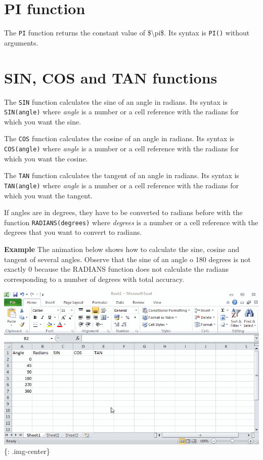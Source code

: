 \section{PI function}
\label{pifunction}

The \texttt{PI} function returns the constant value of \$\textbackslash{}pi\$. Its syntax is \texttt{PI()} without arguments. 

\section{SIN, COS and TAN functions}
\label{sincosandtanfunctions}

The \texttt{SIN} function calculates the sine of an angle in radians. Its syntax is \texttt{SIN(angle)} where \emph{angle} is a number or a cell reference with the radians for which you want the sine. 

The \texttt{COS} function calculates the cosine of an angle in radians. Its syntax is \texttt{COS(angle)} where \emph{angle} is a number or a cell reference with the radians for which you want the cosine. 

The \texttt{TAN} function calculates the tangent of an angle in radians. Its syntax is \texttt{TAN(angle)} where \emph{angle} is a number or a cell reference with the radians for which you want the tangent. 

If angles are in degrees, they have to be converted to radians before with the function \texttt{RADIANS(degrees)} where \emph{degrees} is a number or a cell reference with the degrees that you want to convert to radians. 

\textbf{Example} The animation below shows how to calculate the sine, cosine and tangent of several angles. Observe that the sine of an angle o 180 degrees is not exactly 0 because the RADIANS function does not calculate the radians corresponding to a number of degrees with total accuracy. 

\includegraphics[keepaspectratio,width=\textwidth,height=0.75\textheight]{img/example_function_sin_cos_tan.gif}
\{: .img-center\}

